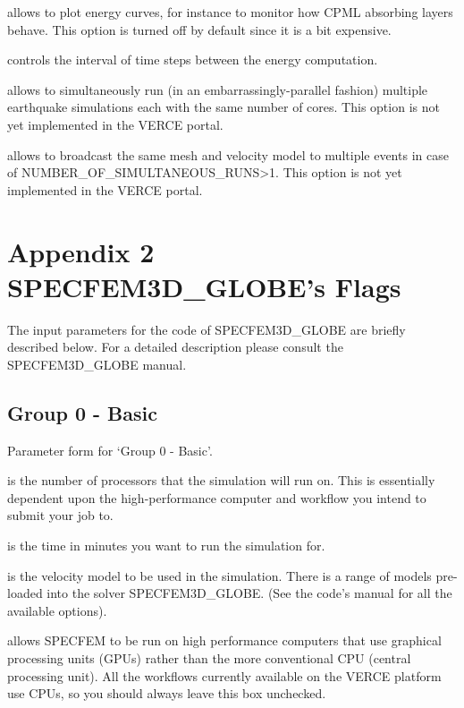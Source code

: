 \documentclass[english]{book}
\begin{document}
 allows to plot energy curves, for instance to monitor
how CPML absorbing layers behave. This option is turned off by default
since it is a bit expensive.

 controls the interval of time steps
between the energy computation.

 allows to simultaneously run (in an
embarrassingly-parallel fashion) multiple earthquake simulations each
with the same number of cores. This option is not yet implemented in the
VERCE portal.

 allows to broadcast the same mesh
and velocity model to multiple events in case of
NUMBER\_OF\_SIMULTANEOUS\_RUNS\textgreater{}1. This option is not yet implemented in
the VERCE portal.


\chapter{Appendix 2 \textendash{} SPECFEM3D\_GLOBE’s Flags}
\label{\detokenize{Appendix2:appendix-2-specfem3d-globes-flags}}\label{\detokenize{Appendix2::doc}}
The input parameters for the code of SPECFEM3D\_GLOBE are briefly
described below. For a detailed description please consult the
SPECFEM3D\_GLOBE manual.


\section{Group 0 - Basic}
\label{\detokenize{Appendix2:a2-1-group-0-basic}}

 Parameter form for ‘Group 0 - Basic’.

 is the number of processors that the simulation will run on.
This is essentially dependent upon the high-performance computer and
workflow you intend to submit your job to.

 is the time in minutes you want to run
the simulation for.

 is the velocity model to be used in the simulation. There is a
range of models pre-loaded into the solver SPECFEM3D\_GLOBE. (See the
code’s manual for all the available options).

 allows SPECFEM to be run on high performance computers
that use graphical processing units (GPUs) rather than the more
conventional CPU (central processing unit). All the workflows currently
available on the VERCE platform use CPUs, so you should always leave
this box unchecked.
\end{document}
